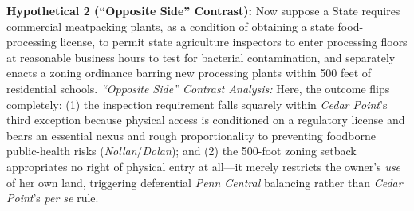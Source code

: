 \documentclass[12pt]{article}
\begin{document}
\textbf{Hypothetical 2 (``Opposite Side'' Contrast):} Now suppose a State requires commercial meatpacking plants, as a condition of obtaining a state food-processing license, to permit state agriculture inspectors to enter processing floors at reasonable business hours to test for bacterial contamination, and separately enacts a zoning ordinance barring new processing plants within 500 feet of residential schools. \emph{``Opposite Side'' Contrast Analysis:} Here, the outcome flips completely: (1) the inspection requirement falls squarely within \textit{Cedar Point}'s third exception because physical access is conditioned on a regulatory license and bears an essential nexus and rough proportionality to preventing foodborne public-health risks (\textit{Nollan}/\textit{Dolan}); and (2) the 500-foot zoning setback appropriates no right of physical entry at all---it merely restricts the owner's \emph{use} of her own land, triggering deferential \textit{Penn Central} balancing rather than \textit{Cedar Point}'s \emph{per se} rule.
\end{document}
